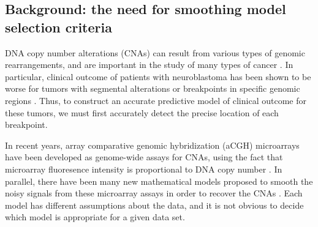 \documentclass[10pt]{bmc_article}
\newcommand{\citep}[1]{\cite{#1}}
\newenvironment{bmcformat}{\begin{raggedright}\baselineskip20pt\sloppy\setboolean{publ}{false}}{\end{raggedright}\baselineskip20pt\sloppy}
\begin{document}
\begin{bmcformat}
\begin{abstract}
\end{abstract}











\section*{Background: the need for smoothing model selection
  criteria}

DNA copy number alterations (CNAs) can result from various types of
genomic rearrangements, and are important in the study of many types
of cancer \citep{weinberg}. In particular, clinical outcome of
patients with neuroblastoma has been shown to be worse for tumors with
segmental alterations or breakpoints in specific genomic regions
\citep{isabelle-2009,gudrun-jclinicaloncology}.  Thus, to construct an
accurate predictive model of clinical outcome for these tumors, we
must first accurately detect the precise location of each breakpoint.


In recent years, array comparative genomic hybridization (aCGH)
microarrays have been developed as genome-wide assays for CNAs, using
the fact that microarray fluoresence intensity is proportional to DNA
copy number \citep{pinkel}. In parallel, there have been many new
mathematical models proposed to smooth the noisy signals from these
microarray assays in order to recover the CNAs
\citep{glad,statistical-approach,dnacopy,cghFLasso,haarseg,fused-lasso-path,gada,pelt}.
Each model has different assumptions about the data, and it is not
obvious to decide which model is appropriate for a given data set.


\end{bmcformat}
\end{document}
